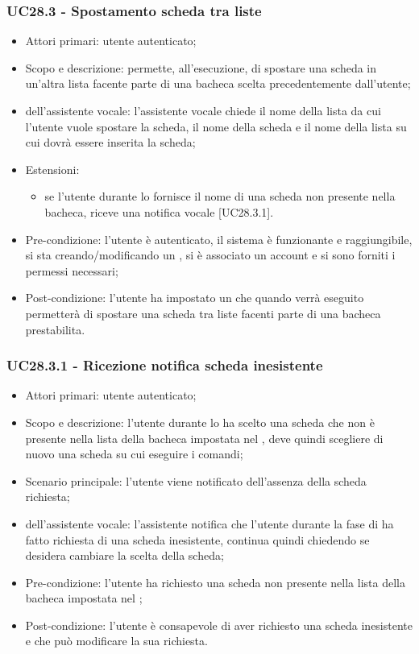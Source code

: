\subsubsection{UC28.3 - Spostamento scheda tra liste }
\begin{itemize}
	\item  Attori primari: utente autenticato;
	\item  Scopo e descrizione: permette, all'esecuzione, di spostare una scheda in un'altra lista facente parte di una bacheca scelta precedentemente dall'utente;
	\item  {} dell'assistente vocale: l'assistente vocale chiede il nome della lista da cui l'utente vuole spostare la scheda, il nome della scheda e il nome della lista su cui dovrà essere inserita la scheda;
	\item  Estensioni: 
		   \begin{itemize}
				\item se l'utente durante lo  fornisce il nome di una scheda non presente nella bacheca, riceve una notifica vocale [UC28.3.1].
		   \end{itemize}
	\item  Pre-condizione: l'utente è autenticato, il sistema è funzionante e raggiungibile, si sta creando/modificando un , si è associato un account  e si sono forniti i permessi necessari;
	\item  Post-condizione: l'utente ha impostato un  che quando verrà eseguito permetterà di spostare una scheda tra liste facenti parte di una bacheca prestabilita.
\end{itemize}
\subsubsection{UC28.3.1 - Ricezione notifica scheda inesistente}
\begin{itemize}
	\item  Attori primari: utente autenticato;
	\item  Scopo e descrizione: l'utente durante lo  ha scelto una scheda che non è presente nella lista della bacheca impostata nel , deve quindi scegliere di nuovo una scheda su cui eseguire i comandi;
	\item  Scenario principale: l'utente viene notificato dell'assenza della scheda richiesta;
	\item  {} dell'assistente vocale: l'assistente notifica che l'utente durante la fase di  ha fatto richiesta di una scheda inesistente, continua quindi chiedendo se desidera cambiare la scelta della scheda;
	\item  Pre-condizione: l'utente ha richiesto una scheda non presente nella lista della bacheca impostata nel ;
	\item  Post-condizione: l'utente è consapevole di aver richiesto una scheda inesistente e che può modificare la sua richiesta.
\end{itemize}
